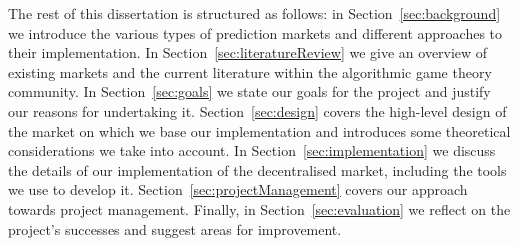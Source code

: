 The rest of this dissertation is structured as follows: in
Section~\ref{sec:background} we introduce the various types of prediction
markets and different approaches to their implementation. In
Section~\ref{sec:literatureReview} we give an overview of existing markets and
the current literature within the algorithmic game theory community. In
Section~\ref{sec:goals} we state our goals for the project and justify our
reasons for undertaking it. Section~\ref{sec:design} covers the high-level
design of the market on which we base our implementation and introduces some
theoretical considerations we take into account. In
Section~\ref{sec:implementation} we discuss the details of our implementation
of the decentralised market, including the tools we use to develop it.
Section~\ref{sec:projectManagement} covers our approach towards project
management. Finally, in Section~\ref{sec:evaluation} we reflect on the
project's successes and suggest areas for improvement.

